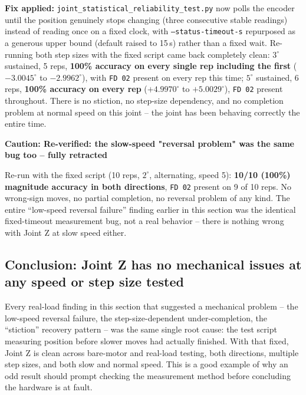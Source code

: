 \documentclass[11pt,letterpaper]{article}
\newenvironment{caution}[1]{%
    \par\addvspace{8pt}%
    \noindent{\color{cautionred}\rule{\linewidth}{0.8pt}}\par\vspace{2pt}
    \noindent\textbf{\color{cautionred}Caution: #1}\par\vspace{2pt}
}{%
    \par\vspace{2pt}\noindent{\color{cautionred}\rule{\linewidth}{0.4pt}}%
    \par\addvspace{8pt}%
}
\begin{document}
\textbf{Fix applied:} \texttt{joint\_statistical\_reliability\_test.py} now polls the encoder until the position genuinely stops changing (three consecutive stable readings) instead of reading once on a fixed clock, with \texttt{--status-timeout-s} repurposed as a generous upper bound (default raised to 15\,s) rather than a fixed wait. Re-running both step sizes with the fixed script came back completely clean: $3^\circ$ sustained, 5 reps, \textbf{100\% accuracy on every single rep including the first} ($-3.0045^\circ$ to $-2.9962^\circ$), with \texttt{FD 02} present on every rep this time; $5^\circ$ sustained, 6 reps, \textbf{100\% accuracy on every rep} ($+4.9970^\circ$ to $+5.0029^\circ$), \texttt{FD 02} present throughout. There is no stiction, no step-size dependency, and no completion problem at normal speed on this joint -- the joint has been behaving correctly the entire time.

\begin{caution}{Re-verified: the slow-speed "reversal problem" was the same bug too -- fully retracted}
Re-run with the fixed script (10 reps, $2^\circ$, alternating, speed 5): \textbf{10/10 (100\%) magnitude accuracy in both directions}, \texttt{FD 02} present on 9 of 10 reps. No wrong-sign moves, no partial completion, no reversal problem of any kind. The entire ``low-speed reversal failure'' finding earlier in this section was the identical fixed-timeout measurement bug, not a real behavior -- there is nothing wrong with Joint Z at slow speed either.
\end{caution}

\subsection{Conclusion: Joint Z has no mechanical issues at any speed or step size tested}
Every real-load finding in this section that suggested a mechanical problem -- the low-speed reversal failure, the step-size-dependent under-completion, the ``stiction'' recovery pattern -- was the same single root cause: the test script measuring position before slower moves had actually finished. With that fixed, Joint Z is clean across bare-motor and real-load testing, both directions, multiple step sizes, and both slow and normal speed. This is a good example of why an odd result should prompt checking the measurement method before concluding the hardware is at fault.
\end{document}

